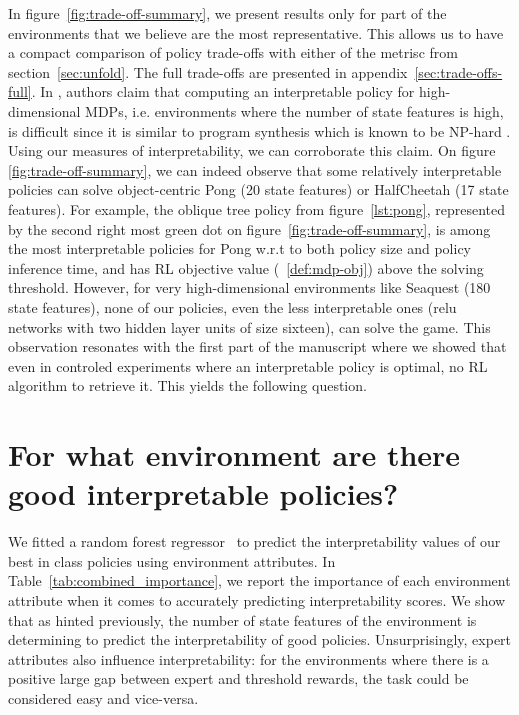 In figure~\ref{fig:trade-off-summary}, we present results only for part of the environments that we believe are the most representative.
This allows us to have a compact comparison of policy trade-offs with either of the metrisc from section~\ref{sec:unfold}.
The full trade-offs are presented in appendix~\ref{sec:trade-offs-full}.
In \cite{glanois-survey}, authors claim that computing an interpretable policy for high-dimensional MDPs, i.e. environments where the number of state features is high, is difficult since it is similar to program synthesis which is known to be NP-hard \cite{program-synth}.
Using our measures of interpretability, we can corroborate this claim.
On figure \ref{fig:trade-off-summary}, we can indeed observe that some relatively interpretable policies can solve object-centric Pong (20 state features) or HalfCheetah (17 state features). 
For example, the oblique tree policy from figure~\ref{lst:pong}, represented by the second right most green dot on figure~\ref{fig:trade-off-summary}, is among the most interpretable policies for Pong w.r.t to both policy size and policy inference time, and has RL objective value (~\ref{def:mdp-obj}) above the solving threshold.  
However, for very high-dimensional environments like Seaquest (180 state features), none of our policies, even the less interpretable ones (relu networks with two hidden layer units of size sixteen), can solve the game.
This observation resonates with the first part of the manuscript where we showed that even in controled experiments where an interpretable policy is optimal, no RL algorithm to retrieve it.
This yields the following question.

\section{For what environment are there good interpretable policies?}
We fitted a random forest regressor~\cite{random} to predict the interpretability values of our best in class policies using environment attributes. 
In Table~\ref{tab:combined_importance}, we report the importance of each environment attribute when it comes to accurately predicting interpretability scores.
We show that as hinted previously, the number of state features of the environment is determining to predict the interpretability of good policies.
Unsurprisingly, expert attributes also influence interpretability: for the environments where there is a positive large gap between expert and threshold rewards, the task could be considered easy and vice-versa.

